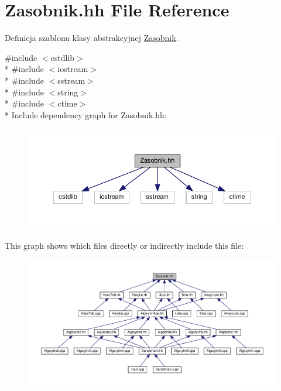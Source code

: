 \hypertarget{a00050}{}\section{Zasobnik.\+hh File Reference}
\label{a00050}


Definicja szablonu klasy abstrakcyjnej \hyperlink{a00017}{Zasobnik}.  


{\ttfamily \#include $<$cstdlib$>$}\\*
{\ttfamily \#include $<$iostream$>$}\\*
{\ttfamily \#include $<$sstream$>$}\\*
{\ttfamily \#include $<$string$>$}\\*
{\ttfamily \#include $<$ctime$>$}\\*
Include dependency graph for Zasobnik.\+hh\+:
\nopagebreak
\begin{figure}[H]
\begin{center}
\leavevmode
\includegraphics[width=350pt]{a00100}
\end{center}
\end{figure}
This graph shows which files directly or indirectly include this file\+:
\nopagebreak
\begin{figure}[H]
\begin{center}
\leavevmode
\includegraphics[width=350pt]{a00101}
\end{center}
\end{figure}

